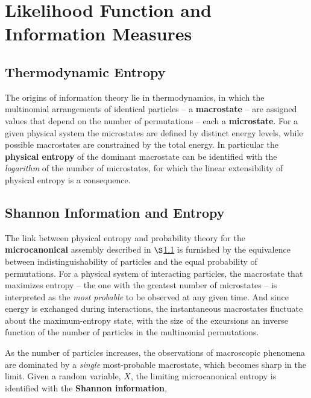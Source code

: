 \documentclass[12pt, twoside, draft]{article}
\begin{document}
\section{Likelihood Function and Information Measures}\label{sec:likelihood_function_information_measures}

\subsection{Thermodynamic Entropy}\label{sec:thermodynamic_entropy}

The origins of information theory lie in thermodynamics, in which the multinomial arrangements of identical particles -- a \textbf{macrostate} -- are assigned values that depend on the number of permutations -- each a \textbf{microstate}.  For a given physical system the microstates are defined by distinct energy levels, while possible macrostates are constrained by the total energy.  In particular the \textbf{physical entropy} of the dominant macrostate can be identified with the \textit{logarithm} of the number of microstates, for which the linear extensibility of physical entropy is a consequence.

\subsection{Shannon Information and Entropy}\label{sec:Shannon_information}

The link between physical entropy and probability theory for the \textbf{microcanonical} assembly described in $\S$\ref{sec:thermodynamic_entropy} is furnished by the equivalence between indistinguishability of particles and the equal probability of permutations.  For a physical system of interacting particles, the macrostate that maximizes entropy -- the one with the greatest number of microstates -- is interpreted as the \textit{most probable} to be observed at any given time.  And since energy is exchanged during interactions, the instantaneous macrostates fluctuate about the maximum-entropy state, with the size of the excursions an inverse function of the number of particles in the multinomial permutations.

As the number of particles increases, the observations of macroscopic phenomena are dominated by a \textit{single} most-probable macrostate, which becomes sharp in the limit. Given a random variable, $X$, the limiting microcanonical entropy is identified with the \textbf{Shannon information},
\end{document}
